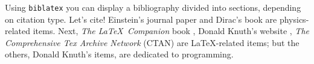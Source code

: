 

Using \texttt{biblatex} you can display a bibliography divided into sections, depending on citation type. 
Let's cite! Einstein's journal paper \cite{einstein} and Dirac's book \cite{dirac} are physics-related items. 
Next, \textit{The \LaTeX\ Companion} book \cite{latexcompanion}, Donald Knuth's website \cite{knuthwebsite}, \textit{The Comprehensive Tex Archive Network} (CTAN) \cite{ctan} are \LaTeX-related items; but the others, Donald Knuth's items, \cite{knuth-fa,knuth-acp} are dedicated to programming. 


\printbibliography[
heading=bibintoc,
title={Whole bibliography}
] %

\printbibliography[heading=subbibintoc,type=article,title={Articles only}]
\printbibliography[type=book,title={Books only}]

\printbibliography[keyword={physics},title={Physics-related only}]
\printbibliography[keyword={latex},title={\LaTeX-related only}]